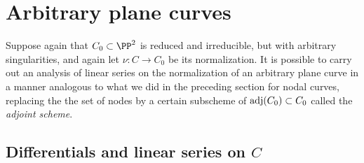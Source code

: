 \section{Arbitrary plane curves} \label{arbitrary plane curves}


Suppose again that $C_0 \subset \PP^2$ is reduced and irreducible, but with arbitrary singularities, and again let $\nu : C \to C_0$ be its normalization. 
It is possible to carry out an analysis of linear series on the normalization of an arbitrary plane curve in a manner  analogous to what we did in the preceding section for nodal curves, replacing the the set of nodes by a certain subscheme of $\adj(C_{0})\subset C_{0}$ called the \emph{adjoint scheme}.


\subsection{Differentials and linear series on $C$}

